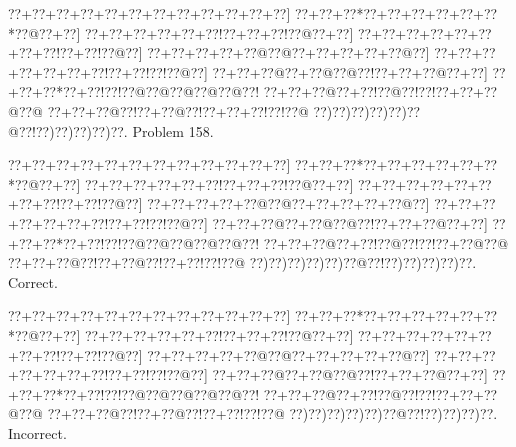 \documentclass[a5paper]{article}
\begin{document}
\newpage
\begin{center}
{\goo
\0??+\0??+\0??+\0??+\0??+\0??+\0??+\0??+\0??+\0??+\0??+\0??]
\0??+\0??+\0??*\0??+\0??+\0??+\0??+\0??+\0??*\0??@\0??+\0??]
\0??+\0??+\0??+\0??+\0??+\0??!\0??+\0??+\0??!\0??@\0??+\0??]
\0??+\0??+\0??+\0??+\0??+\0??+\0??+\0??!\0??+\0??!\0??@\0??]
\0??+\0??+\0??+\0??+\0??@\0??@\0??+\0??+\0??+\0??+\0??@\0??]
\0??+\0??+\0??+\0??+\0??+\0??+\0??!\0??+\0??!\0??!\0??@\0??]
\0??+\0??+\0??@\0??+\0??@\0??@\0??!\0??+\0??+\0??@\0??+\0??]
\0??+\0??+\0??*\0??+\0??!\0??!\0??@\0??@\0??@\0??@\0??@\0??!
\0??+\0??+\0??@\0??+\0??!\0??@\0??!\0??!\0??+\0??+\0??@\0??@
\0??+\0??+\0??@\0??!\0??+\0??@\0??!\0??+\0??+\0??!\0??!\0??@
\0??)\0??)\0??)\0??)\0??)\0??@\0??!\0??)\0??)\0??)\0??)\0??.
}
Problem 158.

\end{center}
\begin{center}
{\goo
\0??+\0??+\0??+\0??+\0??+\0??+\0??+\0??+\0??+\0??+\0??+\0??]
\0??+\0??+\0??*\0??+\0??+\0??+\0??+\0??+\0??*\0??@\0??+\0??]
\0??+\0??+\0??+\0??+\0??+\0??!\0??+\0??+\0??!\0??@\0??+\0??]
\0??+\0??+\0??+\0??+\0??+\0??+\0??+\0??!\0??+\0??!\0??@\0??]
\0??+\0??+\0??+\0??+\0??@\0??@\0??+\0??+\0??+\0??+\0??@\0??]
\0??+\0??+\0??+\0??+\0??+\0??+\0??!\0??+\0??!\0??!\0??@\0??]
\0??+\0??+\0??@\0??+\0??@\0??@\0??!\0??+\0??+\0??@\0??+\0??]
\0??+\0??+\0??*\0??+\0??!\0??!\0??@\0??@\0??@\0??@\0??@\0??!
\0??+\0??+\0??@\0??+\0??!\0??@\0??!\0??!\0??+\0??@\0??@
\0??+\0??+\0??@\0??!\0??+\0??@\0??!\0??+\0??!\0??!\0??@
\0??)\0??)\0??)\0??)\0??)\0??@\0??!\0??)\0??)\0??)\0??)\0??.
}
Correct. 

\end{center}
\begin{center}
{\goo
\0??+\0??+\0??+\0??+\0??+\0??+\0??+\0??+\0??+\0??+\0??+\0??]
\0??+\0??+\0??*\0??+\0??+\0??+\0??+\0??+\0??*\0??@\0??+\0??]
\0??+\0??+\0??+\0??+\0??+\0??!\0??+\0??+\0??!\0??@\0??+\0??]
\0??+\0??+\0??+\0??+\0??+\0??+\0??+\0??!\0??+\0??!\0??@\0??]
\0??+\0??+\0??+\0??+\0??@\0??@\0??+\0??+\0??+\0??+\0??@\0??]
\0??+\0??+\0??+\0??+\0??+\0??+\0??!\0??+\0??!\0??!\0??@\0??]
\0??+\0??+\0??@\0??+\0??@\0??@\0??!\0??+\0??+\0??@\0??+\0??]
\0??+\0??+\0??*\0??+\0??!\0??!\0??@\0??@\0??@\0??@\0??@\0??!
\0??+\0??+\0??@\0??+\0??!\0??@\0??!\0??!\0??+\0??+\0??@\0??@
\0??+\0??+\0??@\0??!\0??+\0??@\0??!\0??+\0??!\0??!\0??@
\0??)\0??)\0??)\0??)\0??)\0??@\0??!\0??)\0??)\0??)\0??.
}
Incorrect. 

\end{center}
\newpage
\end{document}
